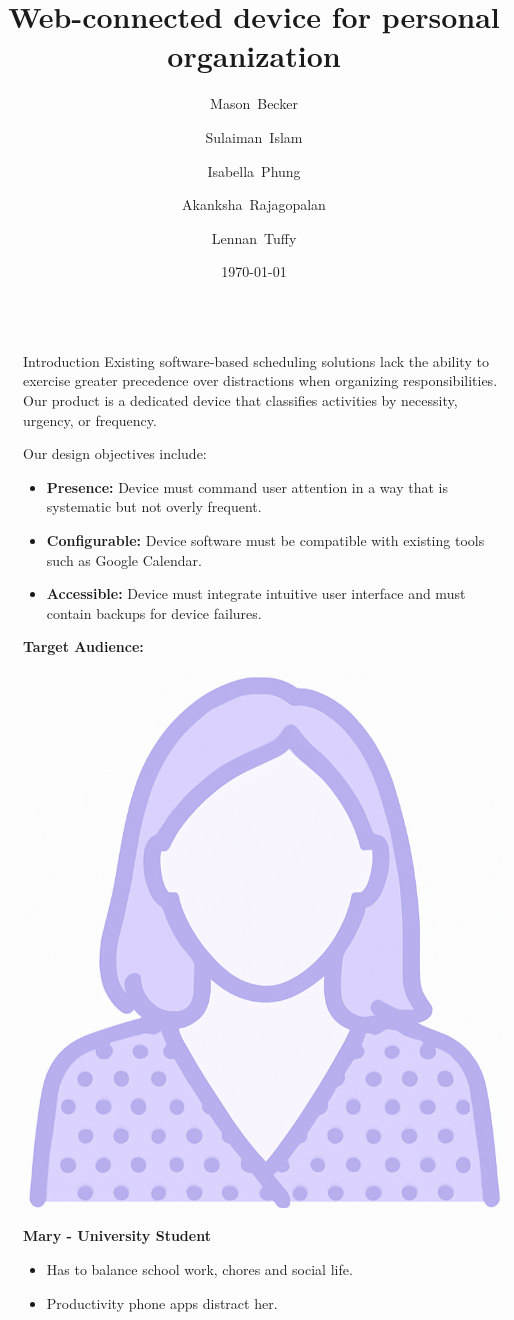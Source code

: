 \documentclass[final, cmyk]{beamer}
\title{Web-connected device for personal organization}
\author{
  Mason~Becker
  \and
  Sulaiman~Islam
  \and
  Isabella~Phung
  \and
  Akanksha~Rajagopalan
  \and
  Lennan~Tuffy
}
\institute[UC Santa Cruz]{CSE 123 - Supervised by Prof. David Harrison and Charlie Alders}
\date{\today}
\newlength{\sepwidth}
\newlength{\colwidth}
\newcommand{\separatorcolumn}{\begin{column}{\sepwidth}\end{column}}
\begin{document}
\begin{frame}[t]
  \begin{columns}[t]
    \separatorcolumn

    \begin{column}{\colwidth}

      \begin{block}{Introduction}
        Existing software-based scheduling solutions lack the ability to exercise 
        greater precedence over distractions when organizing responsibilities. Our product is a dedicated device that classifies activities by necessity, urgency, or frequency.

        Our design objectives include:
        \begin{itemize}
            \item \textbf{Presence:} Device must command user attention in a way that is systematic but not overly frequent.
            \item \textbf{Configurable:} Device software must be compatible with existing tools such as Google Calendar.
            \item \textbf{Accessible:} Device must integrate intuitive user interface and must contain backups for device failures. 
        \end{itemize}
       
        \textbf{Target Audience:}
        \newline
        \newline
        \noindent\begin{minipage}{0.3\linewidth}
        \centering
        \includegraphics[width=0.5\linewidth]{Camillia.png}
        \end{minipage}
        \hfill
        \begin{minipage}{0.7\linewidth}
          \textbf{Mary - University Student}
        \begin{itemize}
            \item Has to balance school work, chores and social life.
            \item Productivity phone apps distract her.
        \end{itemize}
        \end{minipage}


\end{block}
\end{column}
\end{columns}
\end{frame}
\end{document}

